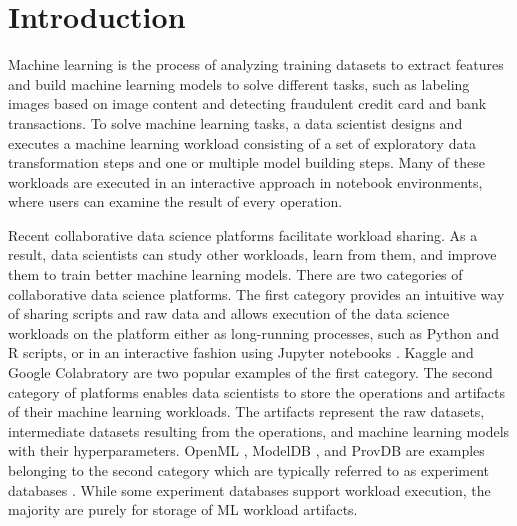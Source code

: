 \section{Introduction} \label{sec-introduction}
Machine learning is the process of analyzing training datasets to extract features and build machine learning models to solve different tasks, such as labeling images based on image content and detecting fraudulent credit card and bank transactions.
To solve machine learning tasks, a data scientist designs and executes a machine learning workload consisting of a set of exploratory data transformation steps and one or multiple model building steps.
Many of these workloads are executed in an interactive approach in notebook environments, where users can examine the result of every operation.

Recent collaborative data science platforms facilitate workload sharing.
As a result, data scientists can study other workloads, learn from them, and improve them to train better machine learning models.
There are two categories of collaborative data science platforms.
The first category provides an intuitive way of sharing scripts and raw data and allows execution of the data science workloads on the platform either as long-running processes, such as Python and R scripts, or in an interactive fashion using Jupyter notebooks \cite{Kluyver:2016aa}.
Kaggle \cite{kagglewebsite} and Google Colabratory \cite{googlecolab} are two popular examples of the first category.
The second category of platforms enables data scientists to store the operations and artifacts of their machine learning workloads.
The artifacts represent the raw datasets, intermediate datasets resulting from the operations, and machine learning models with their hyperparameters.
OpenML \cite{vanschoren2014openml}, ModelDB \cite{vartak2016m}, and ProvDB \cite{miao2018provdb} are examples belonging to the second category which are typically referred to as experiment databases \cite{Vanschoren2012}.
While some experiment databases support workload execution, the majority are purely for storage of ML workload artifacts.

